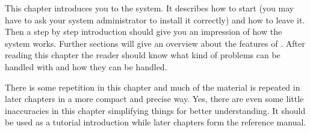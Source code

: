 
This  chapter introduces you to  the {\GAP} system.  It  describes how to
start {\GAP} (you may have to ask your system administrator to install it
correctly) and  how to leave it.  Then a step by step introduction should
give you an impression of how the {\GAP} system  works.  Further sections
will give an overview about the features of {\GAP}.   After  reading this
chapter the reader should know what kind of problems can be handled  with
{\GAP} and how they can be handled.

There is  some  repetition in  this chapter and much  of the material  is
repeated in later chapters in a more compact and precise way.  Yes, there
are even  some little inaccuracies in this chapter simplifying things for
better understanding.  It should be used as a tutorial introduction while
later chapters form the reference manual.

